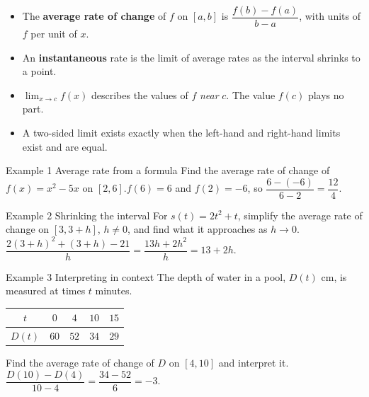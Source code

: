 \documentclass[11pt]{article}
\begin{document}

\begin{ideabox}
\begin{itemize}[leftmargin=*,itemsep=2pt,topsep=2pt]
  \item The \textbf{average rate of change} of $f$ on $[a,b]$ is $\dfrac{f(b)-f(a)}{b-a}$, with units of $f$ per unit of $x$.
  \item An \textbf{instantaneous} rate is the limit of average rates as the interval shrinks to a point.
  \item $\displaystyle\lim_{x\to c}f(x)$ describes the values of $f$ \emph{near} $c$. The value $f(c)$ plays no part.
  \item A two-sided limit exists exactly when the left-hand and right-hand limits exist and are equal.
\end{itemize}
\end{ideabox}

\begin{example}{Example 1 \textperiodcentered{} Average rate from a formula}
Find the average rate of change of $f(x)=x^2-5x$ on $[2,6]$.\soln $f(6)=6$ and $f(2)=-6$, so $\dfrac{6-(-6)}{6-2}=\dfrac{12}{4}$.
\end{example}

\begin{example}{Example 2 \textperiodcentered{} Shrinking the interval}
For $s(t)=2t^2+t$, simplify the average rate of change on $[3,3+h]$, $h\neq0$, and find what it approaches as $h\to0$.\soln $\dfrac{2(3+h)^2+(3+h)-21}{h}=\dfrac{13h+2h^2}{h}=13+2h$.
\end{example}

\begin{example}{Example 3 \textperiodcentered{} Interpreting in context}
The depth of water in a pool, $D(t)$ cm, is measured at times $t$ minutes.\begin{center}\renewcommand{\arraystretch}{1.25}\begin{tabular}{|c|c|c|c|c|}\hline $t$ & $0$ & $4$ & $10$ & $15$ \\ \hline $D(t)$ & $60$ & $52$ & $34$ & $29$ \\ \hline\end{tabular}\end{center}Find the average rate of change of $D$ on $[4,10]$ and interpret it.\soln $\dfrac{D(10)-D(4)}{10-4}=\dfrac{34-52}{6}=-3$.
\end{example}
\end{document}

